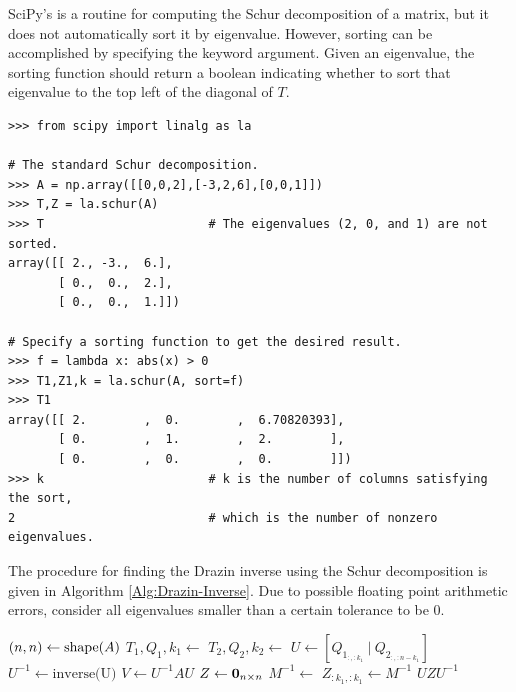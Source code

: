 SciPy's  is a routine for computing the Schur decomposition of a matrix, but it does not automatically sort it by eigenvalue.
However, sorting can be accomplished by specifying the  keyword argument. 
Given an eigenvalue, the sorting function should return a boolean indicating whether to sort that eigenvalue to the top left of the diagonal of $T$. 


\begin{lstlisting}
>>> from scipy import linalg as la

# The standard Schur decomposition.
>>> A = np.array([[0,0,2],[-3,2,6],[0,0,1]])
>>> T,Z = la.schur(A)
>>> T                       # The eigenvalues (2, 0, and 1) are not sorted.
array([[ 2., -3.,  6.],
       [ 0.,  0.,  2.],
       [ 0.,  0.,  1.]])

# Specify a sorting function to get the desired result.
>>> f = lambda x: abs(x) > 0
>>> T1,Z1,k = la.schur(A, sort=f)
>>> T1
array([[ 2.        ,  0.        ,  6.70820393],
       [ 0.        ,  1.        ,  2.        ],
       [ 0.        ,  0.        ,  0.        ]])
>>> k                       # k is the number of columns satisfying the sort,
2                           # which is the number of nonzero eigenvalues.
\end{lstlisting}

The procedure for finding the Drazin inverse using the Schur decomposition is given in Algorithm \ref{Alg:Drazin-Inverse}.
Due to possible floating point arithmetic errors, consider all eigenvalues smaller than a certain tolerance to be $0$.

\begin{algorithm}[H]
\begin{algorithmic}[1]
    \State $(n,n) \gets \mathrm{shape}(A)$
    \State $T_1,Q_1,k_1 \gets $ 
    \State $T_2,Q_2,k_2 \gets $ 
    \State $U \gets [Q_{1_{:,:k_1}}\ |\ Q_{2_{:,:n - k_1}}]$
    \State $U^{-1} \gets \text{inverse(U)}$
    \State $V \gets U^{-1}AU$
    \State $Z \gets \mathbf{0}_{n\times n}$
        \State $M^{-1} \gets $ 
        \State $Z_{:k_1,:k_1} \gets M^{-1}$
    \EndIf
    \State {} $UZU^{-1}$
\EndProcedure
\end{algorithmic}
\caption{}
\label{Alg:Drazin-Inverse}
\end{algorithm}

